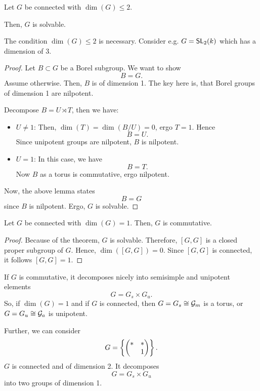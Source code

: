 \begin{theorem}
	Let $G$ be connected with $\dim(G) \leq 2$.
	
	Then, $G$ is solvable.
\end{theorem}
\begin{example}
	The condition $\dim(G) \leq 2$ is necessary. Consider e.g. $G= \textsf{SL}_2(k)$ which has a dimension of $3$.
\end{example}
\begin{proof}
	Let $B \subset G$ be a Borel subgroup. We want to show
	\[ B = G.\]
	Assume otherwise. Then, $B$ is of dimension 1. The key here is, that Borel groups of dimension 1 are nilpotent.
	
	Decompose $B = U \rtimes T$, then we have:
	\begin{itemize}
	\item $U \neq 1$: Then, $\dim(T) = \dim(B / U) = 0$, ergo $T = 1$. Hence
	\[ B = U.\]
	Since unipotent groups are nilpotent, $B$ is nilpotent.
	\item $U = 1$: In this case, we have
	\[ B = T.\]
	Now $B$ as a torus is commutative, ergo nilpotent.
	\end{itemize}
Now, the above lemma states
\[ B=G \]
since $B$ is nilpotent. Ergo, $G$ is solvable.
\end{proof}

\begin{corollary}
	Let $G$ be connected with $\dim(G) = 1$. Then, $G$ is commutative.
\end{corollary}
\begin{proof}
	Because of the theorem, $G$ is solvable. Therefore,
	$[G,G]$ is a closed proper subgroup of $G$. Hence, $\dim([G,G]) = 0$. Since $[G,G]$ is connected, it follows $[G,G] = 1$.
\end{proof}
\begin{remark}
	If $G$ is commutative, it decomposes nicely into semisimple and unipotent elements
	\[ G = G_s \times G_u. \]
	So, if $\dim(G) = 1$ and if $G$ is connected, then $G = G_s\overset{}{\cong} \mathcal{G}_m$ is a torus, or $G = G_u \overset{}{\cong} \mathcal{G}_a$ is unipotent.
	
	Further, we can consider
	\[ G = \left\lbrace\left(\begin{matrix}  * & * \\  & 1 \end{matrix}\right)\right\rbrace. \]
	$G$ is connected and of dimension 2. It decomposes
	\[ G = G_s \times G_u \]
	into two groups of dimension 1.
\end{remark}